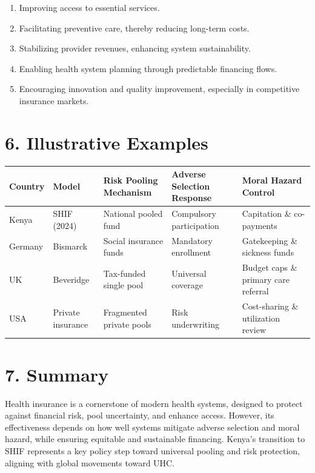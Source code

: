 \documentclass[10pt]{article}
\begin{document}
\begin{enumerate}
  \item Improving access to essential services.
  \item Facilitating preventive care, thereby reducing long-term costs.
  \item Stabilizing provider revenues, enhancing system sustainability.
  \item Enabling health system planning through predictable financing flows.
  \item Encouraging innovation and quality improvement, especially in competitive insurance markets.
\end{enumerate}

\section*{6. Illustrative Examples}
\begin{center}
\begin{tabular}{|l|l|l|l|l|}
\hline
Country & Model & Risk Pooling Mechanism & Adverse Selection Response & Moral Hazard Control \\
\hline
Kenya & SHIF (2024) & National pooled fund & Compulsory participation & Capitation \& co-payments \\
\hline
Germany & Bismarck & Social insurance funds & Mandatory enrollment & Gatekeeping \& sickness funds \\
\hline
UK & Beveridge & Tax-funded single pool & Universal coverage & Budget caps \& primary care referral \\
\hline
USA & Private insurance & Fragmented private pools & Risk underwriting & Cost-sharing \& utilization review \\
\hline
\end{tabular}
\end{center}

\section*{7. Summary}
Health insurance is a cornerstone of modern health systems, designed to protect against financial risk, pool uncertainty, and enhance access. However, its effectiveness depends on how well systems mitigate adverse selection and moral hazard, while ensuring equitable and sustainable financing. Kenya's transition to SHIF represents a key policy step toward universal pooling and risk protection, aligning with global movements toward UHC.
\end{document}
